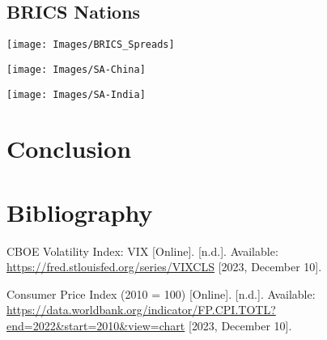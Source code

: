 \documentclass[11pt,preprint, authoryear]{elsarticle}
\let\origfigure\figure
\let\endorigfigure\endfigure
\renewenvironment{figure}[1][2] {
    \expandafter\origfigure\expandafter[H]
} {
    \endorigfigure
}
\numberwithin{equation}{section}
\numberwithin{figure}{section}
\numberwithin{table}{section}
\begin{document}
\hypertarget{brics-nations}{%
\subsection{BRICS Nations}\label{brics-nations}}

\begin{figure}

{\centering \texttt{[image: Images/BRICS\_Spreads]} 

}

\caption{BRICS Bond Yield Spreads \label{Figure4.3}}\label{fig:unnamed-chunk-11}
\end{figure}

\begin{figure}

{\centering \texttt{[image: Images/SA-China]} 

}

\caption{SA vs China Yield Spread \label{Figure4.4}}\label{fig:unnamed-chunk-12}
\end{figure}

\begin{figure}

{\centering \texttt{[image: Images/SA-India]} 

}

\caption{SA vs India Yield Spread \label{Figure4.5}}\label{fig:unnamed-chunk-13}
\end{figure}

\hypertarget{conclusion}{%
\section{Conclusion}\label{conclusion}}

\newpage

\hypertarget{bibliography}{%
\section{Bibliography}\label{bibliography}}

CBOE Volatility Index: VIX {[}Online{]}. {[}n.d.{]}. Available:
\url{https://fred.stlouisfed.org/series/VIXCLS} {[}2023, December 10{]}.

Consumer Price Index (2010 = 100) {[}Online{]}. {[}n.d.{]}. Available:
\url{https://data.worldbank.org/indicator/FP.CPI.TOTL?end=2022\&start=2010\&view=chart}
{[}2023, December 10{]}.
\end{document}
